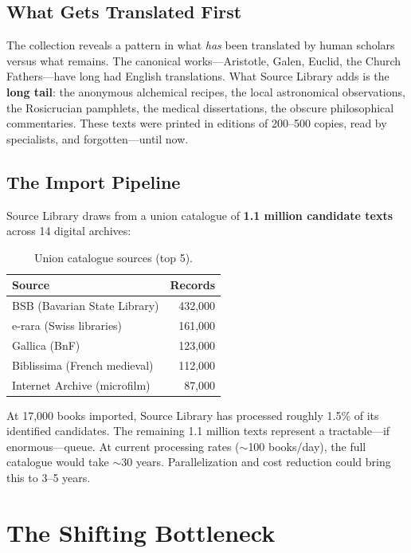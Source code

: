 \documentclass[10pt,twocolumn]{article}
\begin{document}
\subsection{What Gets Translated First}

The collection reveals a pattern in what \emph{has} been translated by human scholars versus what remains. The canonical works---Aristotle, Galen, Euclid, the Church Fathers---have long had English translations. What Source Library adds is the \textbf{long tail}: the anonymous alchemical recipes, the local astronomical observations, the Rosicrucian pamphlets, the medical dissertations, the obscure philosophical commentaries. These texts were printed in editions of 200--500 copies, read by specialists, and forgotten---until now.

\subsection{The Import Pipeline}

Source Library draws from a union catalogue of \textbf{1.1 million candidate texts} across 14 digital archives:

\begin{table}[H]
\small
\centering
\caption{Union catalogue sources (top 5).}
\label{tab:union}
\begin{tabular}{@{}lr@{}}
\toprule
Source & Records \\
\midrule
BSB (Bavarian State Library) & 432,000 \\
e-rara (Swiss libraries) & 161,000 \\
Gallica (BnF) & 123,000 \\
Biblissima (French medieval) & 112,000 \\
Internet Archive (microfilm) & 87,000 \\
\bottomrule
\end{tabular}
\end{table}

At 17,000 books imported, Source Library has processed roughly 1.5\% of its identified candidates. The remaining 1.1 million texts represent a tractable---if enormous---queue. At current processing rates (${\sim}$100 books/day), the full catalogue would take ${\sim}$30 years. Parallelization and cost reduction could bring this to 3--5 years.

\section{The Shifting Bottleneck}
\end{document}
